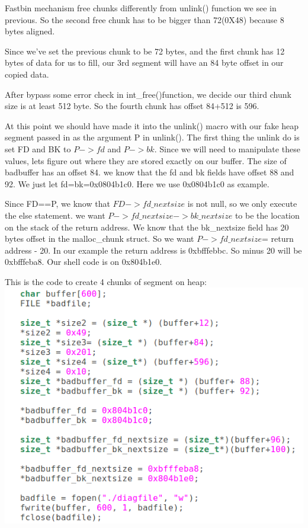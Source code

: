 \documentclass[12pt]{article}
\begin{document}
Fastbin mechanism free chunks differently from unlink() function we see in previous. So the second free chunk has to be bigger than 72(0X48) because 8 bytes aligned.

Since we've set the previous chunk to be 72 bytes, and the first chunk has 12 bytes of data for us to fill, our 3rd segment will have an 84 byte offset in our copied data.

After bypass some error check in int\_free()function, we decide our third chunk size is at least 512 byte. So the fourth chunk has offset 84+512 is 596.

At this point we should have made it into the unlink() macro with our fake heap segment passed in as the argument P in unlink(). The first thing the unlink do is set FD and BK to $P->fd$ and $P->bk$. Since we will need to manipulate these values, lets figure out where they are stored exactly on our buffer. The size of badbuffer has an offset 84. we know that the fd and bk fields have offset 88 and 92. We just let fd=bk=0x0804b1c0. Here we use 0x0804b1c0 as example.

Since FD==P, we know that $FD->fd\_nextsize$ is not null, so we only execute the else statement. we want $P->fd\_nextsize->bk\_nextsize$ to be the location on the stack of the return address. We know that the bk\_nextsize field has 20 bytes offset in the malloc\_chunk struct. So we want $P->fd\_nextsize$= return address - 20. In our example the return address is 0xbfffebbc. So minus 20 will be 0xbfffeba8. Our shell code is on 0x804b1e0.   
 
This is the code to create 4 chunks of segment on heap: \\
\includegraphics[scale=0.5]{diag_code.png}
  
\end{document}
